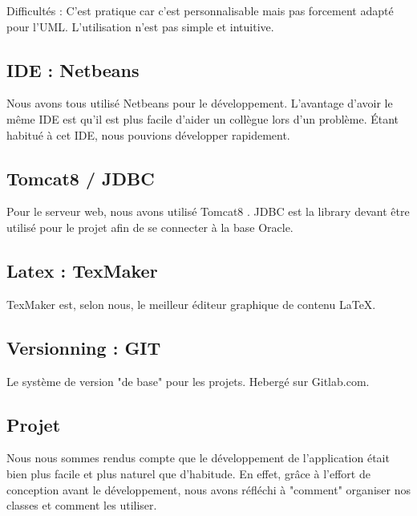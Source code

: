 \documentclass[a4paper,oneside,10pt]{article}
\begin{document}
Difficultés : C'est pratique car c'est personnalisable mais pas forcement adapté pour l'UML. L'utilisation n'est pas simple et intuitive. 

\subsection{IDE : Netbeans}

Nous avons tous utilisé Netbeans pour le développement. L'avantage d'avoir le même IDE est qu'il est plus facile d'aider un collègue lors d'un problème. Étant habitué à cet IDE, nous pouvions développer rapidement. 

\subsection{Tomcat8 / JDBC}

Pour le serveur web, nous avons utilisé Tomcat8 . 
JDBC est la library devant être utilisé pour le projet afin de se connecter à la base Oracle.  

\subsection{Latex : TexMaker}

TexMaker est, selon nous, le meilleur éditeur graphique de contenu \LaTeX. 

\subsection{Versionning : GIT}

Le système de version "de base" pour les projets. Hebergé sur Gitlab.com. 


\subsection{Projet}

Nous nous sommes rendus compte que le développement de l'application était bien plus facile et plus naturel que d'habitude. En effet, grâce à l'effort de conception avant le développement, nous avons réfléchi à "comment" organiser nos classes et comment les utiliser. 
\end{document}
